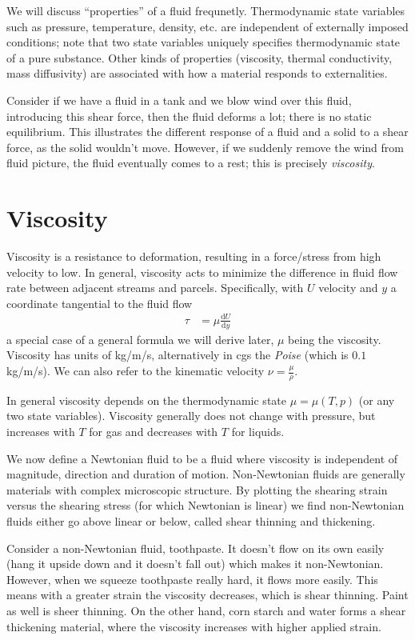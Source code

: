 \documentclass[10pt]{report}
\newcommand{\rd}[2]{\frac{\mathrm{d}#1}{\mathrm{d}#2}}
\begin{document}
We will discuss ``properties'' of a fluid frequnetly. Thermodynamic state variables such as pressure, temperature, density, etc. are independent of externally imposed conditions; note that two state variables uniquely specifies thermodynamic state of a pure substance. Other kinds of properties (viscosity, thermal conductivity, mass diffusivity) are associated with how a material responds to externalities.

Consider if we have a fluid in a tank and we blow wind over this fluid, introducing this shear force, then the fluid deforms a lot; there is no static equilibrium. This illustrates the different response of a fluid and a solid to a shear force, as the solid wouldn't move. However, if we suddenly remove the wind from fluid picture, the fluid eventually comes to a rest; this is precisely \emph{viscosity}.

\section{Viscosity}

Viscosity is a resistance to deformation, resulting in a force/stress from high velocity to low. In general, viscosity acts to minimize the difference in fluid flow rate between adjacent streams and parcels. Specifically, with $U$ velocity and $y$ a coordinate tangential to the fluid flow
\begin{align}
    \tau &= \mu \rd{U}{y}
\end{align}
a special case of a general formula we will derive later, $\mu$ being the viscosity. Viscosity has units of kg/m/s, alternatively in cgs the \emph{Poise} (which is $0.1$ kg/m/s). We can also refer to the kinematic velocity $\nu = \frac{\mu}{\rho}$.

In general viscosity depends on the thermodynamic state $\mu = \mu(T,p)$ (or any two state variables). Viscosity generally does not change with pressure, but increases with $T$ for gas and decreases with $T$ for liquids.

We now define a Newtonian fluid to be a fluid where viscosity is independent of magnitude, direction and duration of motion. Non-Newtonian fluids are generally materials with complex microscopic structure. By plotting the shearing strain versus the shearing stress (for which Newtonian is linear) we find non-Newtonian fluids either go above linear or below, called shear thinning and thickening.

Consider a non-Newtonian fluid, toothpaste. It doesn't flow on its own easily (hang it upside down and it doesn't fall out) which makes it non-Newtonian. However, when we squeeze toothpaste really hard, it flows more easily. This means with a greater strain the viscosity decreases, which is shear thinning. Paint as well is sheer thinning. On the other hand, corn starch and water forms a shear thickening material, where the viscosity increases with higher applied strain.
\end{document}
